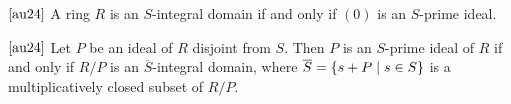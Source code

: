 \documentclass[11pt]{article}
\begin{document}
	\begin{lem}$\cite{au24}$\label{int}
		A ring $R$ is an $S$-integral domain if and only if $(0)$ is an $S$-prime ideal.
	\end{lem}
	
	\begin{prop}$\cite{au24}$\label{sint}
		Let $P$ be an ideal of $R$ disjoint from $S$. Then $P$ is an $S$-prime ideal of $R$ if and only if $R/P$ is an $\overline{S}$-integral domain, where $\overline{S}=\{s+P\hspace{0.1cm}|\hspace{0.1cm}s\in S\}$ is a multiplicatively closed subset of $R/P$.
	\end{prop}
	
\end{document}
